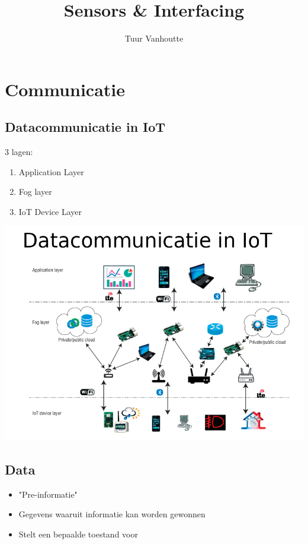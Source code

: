 \documentclass{article}
\begin{document}
\begin{titlepage}
    \author{Tuur Vanhoutte}
    \title{Sensors \& Interfacing}
\end{titlepage}

\maketitle
\newpage
\tableofcontents
\newpage


\section {Communicatie}
\subsection{Datacommunicatie in IoT}
3 lagen:
\begin{enumerate}
    \item Application Layer
    \item Fog layer
    \item IoT Device Layer
\end{enumerate}

\includegraphics[width=1\textwidth]{Screenshot_20200210_120010.png}

\subsection{Data}
\begin{itemize}
    \item "Pre-informatie"
    \item Gegevens waaruit informatie kan worden gewonnen
    \item Stelt een bepaalde toestand voor
\end{itemize}
\end{document}
